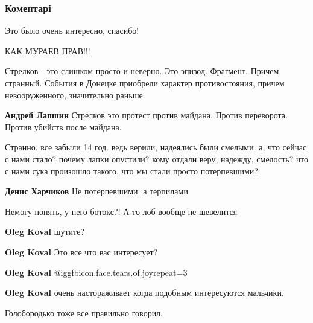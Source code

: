  
 
 
 
 
\subsubsection{Коментарі}
\label{sec:21_11_2021.fb.murajev_jevgenij.1.revolucia.cmt}

\begin{itemize} %
Это было очень интересно, спасибо!

КАК МУРАЕВ ПРАВ!!!


Стрелков - это слишком просто и неверно. Это эпизод. Фрагмент. Причем странный.
События в Донецке приобрели характер противостояния, причем невооруженного,
значительно раньше.

\textbf{Андрей Лапшин} Стрелков это протест против майдана. Против переворота. Против убийств после майдана.


Странно. все забыли 14 год. ведь верили, надеялись были смелыми. а, что сейчас с
нами стало? почему лапки опустили? кому отдали веру, надежду, смелость? что с нами
сука произошло такого, что мы стали просто потерпевшими?

\textbf{Денис Харчиков} Не потерпевшими. а терпилами

Немогу понять, у него ботокс?! А то лоб вообще не шевелится

\begin{itemize} %
\textbf{Oleg Koval} шутите?

\textbf{Oleg Koval} Это все что вас интересует?

\textbf{Oleg Koval}  @igg{fbicon.face.tears.of.joy}{repeat=3} 

\textbf{Oleg Koval} очень настораживает когда подобным интересуются мальчики.
\end{itemize} %

Голобородько тоже все правильно говорил.


\end{itemize}
